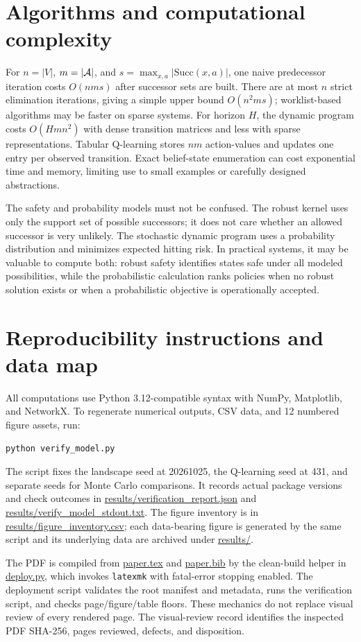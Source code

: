 \documentclass[11pt]{article}
\theoremstyle{definition}\newtheorem{definition}[proposition]{Definition}\theoremstyle{remark}\newtheorem{remark}[proposition]{Remark}
\begin{document}
\section{Algorithms and computational complexity}
For $n=|V|$, $m=|\mathcal{A}|$, and $s=\max_{x,a}|\mathrm{Succ}(x,a)|$, one naive predecessor iteration costs $O(nms)$ after successor sets are built. There are at most $n$ strict elimination iterations, giving a simple upper bound $O(n^2ms)$; worklist-based algorithms may be faster on sparse systems. For horizon $H$, the dynamic program costs $O(Hmn^2)$ with dense transition matrices and less with sparse representations. Tabular Q-learning stores $nm$ action-values and updates one entry per observed transition. Exact belief-state enumeration can cost exponential time and memory, limiting use to small examples or carefully designed abstractions.

The safety and probability models must not be confused. The robust kernel uses only the support set of possible successors; it does not care whether an allowed successor is very unlikely. The stochastic dynamic program uses a probability distribution and minimizes expected hitting risk. In practical systems, it may be valuable to compute both: robust safety identifies states safe under all modeled possibilities, while the probabilistic calculation ranks policies when no robust solution exists or when a probabilistic objective is operationally accepted.

\section{Reproducibility instructions and data map}
All computations use Python 3.12-compatible syntax with NumPy, Matplotlib, and NetworkX. To regenerate numerical outputs, CSV data, and 12 numbered figure assets, run:
\begin{verbatim}python verify_model.py\end{verbatim}
The script fixes the landscape seed at 20261025, the Q-learning seed at 431, and separate seeds for Monte Carlo comparisons. It records actual package versions and check outcomes in \url{results/verification_report.json} and \url{results/verify_model_stdout.txt}. The figure inventory is in \url{results/figure_inventory.csv}; each data-bearing figure is generated by the same script and its underlying data are archived under \url{results/}.

The PDF is compiled from \url{paper.tex} and \url{paper.bib} by the clean-build helper in \url{deploy.py}, which invokes \texttt{latexmk} with fatal-error stopping enabled. The deployment script validates the root manifest and metadata, runs the verification script, and checks page/figure/table floors. These mechanics do not replace visual review of every rendered page. The visual-review record identifies the inspected PDF SHA-256, pages reviewed, defects, and disposition.
\end{document}
